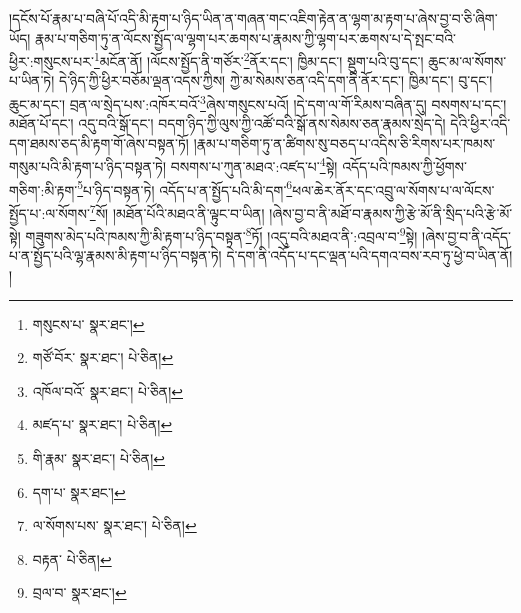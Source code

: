 །དངོས་པོ་རྣམ་པ་བཞི་པོ་འདི་མི་རྟག་པ་ཉིད་ཡིན་ན་གཞན་གང་འཇིག་རྟེན་ན་ལྷག་མ་རྟག་པ་ཞེས་བྱ་བ་ཅི་ཞིག་ཡོད། རྣམ་པ་གཅིག་ཏུ་ན་ལོངས་སྤྱོད་ལ་ལྷག་པར་ཆགས་པ་རྣམས་ཀྱི་ལྷག་པར་ཆགས་པ་དེ་སྤང་བའི་ཕྱིར་:གསུངས་པར་\footnote{གསུངས་པ་  སྣར་ཐང་། }མངོན་ནོ། །ལོངས་སྤྱོད་ནི་གཙོར་\footnote{གཙོ་བོར་  སྣར་ཐང་།  པེ་ཅིན། }ནོར་དང་། ཁྱིམ་དང་། སྡུག་པའི་བུ་དང་། ཆུང་མ་ལ་སོགས་པ་ཡིན་ཏེ། དེ་ཉིད་ཀྱི་ཕྱིར་བཅོམ་ལྡན་འདས་ཀྱིས། ཀྱེ་མ་སེམས་ཅན་འདི་དག་ནི་ནོར་དང་། ཁྱིམ་དང་། བུ་དང་། ཆུང་མ་དང་། བྲན་ལ་སྲེད་པས་:འཁོར་བའོ་\footnote{འཁོལ་བའོ་  སྣར་ཐང་།  པེ་ཅིན། }ཞེས་གསུངས་པའོ། །དེ་དག་ལ་གོ་རིམས་བཞིན་དུ། བསགས་པ་དང་། མཐོན་པོ་དང་། འདུ་བའི་སྒོ་དང་། བདག་ཉིད་ཀྱི་ལུས་ཀྱི་འཚོ་བའི་སྒོ་ནས་སེམས་ཅན་རྣམས་སྲེད་དེ། དེའི་ཕྱིར་འདི་དག་ཐམས་ཅད་མི་རྟག་གོ་ཞེས་བསྟན་ཏོ། །རྣམ་པ་གཅིག་ཏུ་ན་ཚིགས་སུ་བཅད་པ་འདིས་ཅི་རིགས་པར་ཁམས་གསུམ་པའི་མི་རྟག་པ་ཉིད་བསྟན་ཏེ། བསགས་པ་ཀུན་མཐའ་:འཛད་པ་\footnote{མཛད་པ་  སྣར་ཐང་།  པེ་ཅིན། }སྟེ། འདོད་པའི་ཁམས་ཀྱི་ཕྱོགས་གཅིག་:མི་རྟག་\footnote{གི་རྣམ་  སྣར་ཐང་།  པེ་ཅིན། }པ་ཉིད་བསྟན་ཏེ། འདོད་པ་ན་སྤྱོད་པའི་མི་དག་\footnote{དག་པ་  སྣར་ཐང་། }ཕལ་ཆེར་ནོར་དང་འབྲུ་ལ་སོགས་པ་ལ་ལོངས་སྤྱོད་པ་:ལ་སོགས་\footnote{ལ་སོགས་པས་  སྣར་ཐང་།  པེ་ཅིན། }སོ། །མཐོན་པོའི་མཐའ་ནི་ལྟུང་བ་ཡིན། །ཞེས་བྱ་བ་ནི་མཐོ་བ་རྣམས་ཀྱི་རྩེ་མོ་ནི་སྲིད་པའི་རྩེ་མོ་སྟེ། གཟུགས་མེད་པའི་ཁམས་ཀྱི་མི་རྟག་པ་ཉིད་བསྟན་\footnote{བརྟན་  པེ་ཅིན། }ཏོ། །འདུ་བའི་མཐའ་ནི་:འབྲལ་བ་\footnote{བྲལ་བ་  སྣར་ཐང་། }སྟེ། །ཞེས་བྱ་བ་ནི་འདོད་པ་ན་སྤྱོད་པའི་ལྷ་རྣམས་མི་རྟག་པ་ཉིད་བསྟན་ཏེ། དེ་དག་ནི་འདོད་པ་དང་ལྡན་པའི་དགའ་བས་རབ་ཏུ་ཕྱེ་བ་ཡིན་ནོ། །

